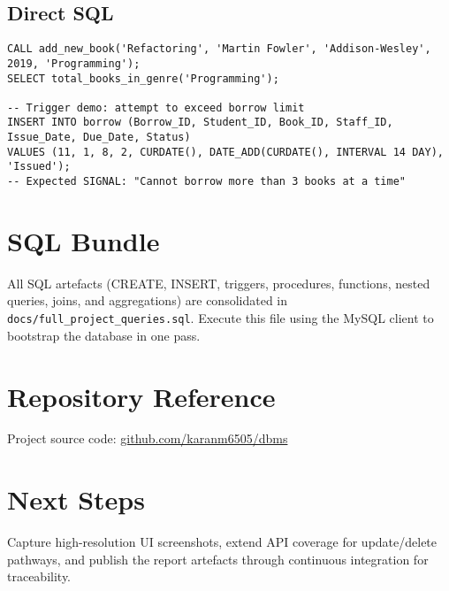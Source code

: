 \documentclass[12pt]{article}
\begin{document}
\subsection{Direct SQL}
\begin{lstlisting}[style=sqlstyle,caption={Invoking stored routines and inspecting triggers}]
CALL add_new_book('Refactoring', 'Martin Fowler', 'Addison-Wesley', 2019, 'Programming');
SELECT total_books_in_genre('Programming');

-- Trigger demo: attempt to exceed borrow limit
INSERT INTO borrow (Borrow_ID, Student_ID, Book_ID, Staff_ID, Issue_Date, Due_Date, Status)
VALUES (11, 1, 8, 2, CURDATE(), DATE_ADD(CURDATE(), INTERVAL 14 DAY), 'Issued');
-- Expected SIGNAL: "Cannot borrow more than 3 books at a time"
\end{lstlisting}

\section{SQL Bundle}
All SQL artefacts (CREATE, INSERT, triggers, procedures, functions, nested queries, joins, and aggregations) are consolidated in \texttt{docs/full\_project\_queries.sql}. Execute this file using the MySQL client to bootstrap the database in one pass.

\section{Repository Reference}
Project source code: \href{https://github.com/karanm6505/dbms}{github.com/karanm6505/dbms}

\section*{Next Steps}
Capture high-resolution UI screenshots, extend API coverage for update/delete pathways, and publish the report artefacts through continuous integration for traceability.
\end{document}
